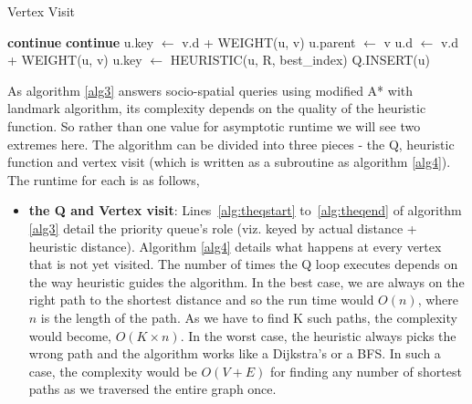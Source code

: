 {\begin{algorithm}[t]
\begin{scriptsize}
\begin{algorithmic}[1]
\end{algorithmic}

\end{scriptsize}
\end{algorithm}


\begin{algorithm}[t]
\caption{Vertex Visit}
\begin{scriptsize}
\label{alg4}
\begin{algorithmic}[1]
		 \label{alg:liesin}
			\State \textbf{continue}
		\EndIf
					\State \textbf{continue}
				\Else
					\State u.key $\gets$ v.d + WEIGHT(u, v)
				\EndIf
			\Else
				\State u.parent $\gets$ v
				\State u.d $\gets$ v.d + WEIGHT(u, v)
				\State u.key $\gets$ HEURISTIC(u, R, best\_index)
				\State Q.INSERT(u)
			\EndIf
		\EndIf
	\EndFor
\EndFunction
\end{algorithmic}

\end{scriptsize}
\end{algorithm}

As algorithm \ref{alg3} answers socio-spatial queries using modified A* with landmark algorithm, its complexity depends on the quality of the heuristic function. So rather than one value for asymptotic runtime we will see two extremes here. The algorithm can be divided into three pieces - the Q, heuristic function and vertex visit (which is written as a subroutine as algorithm \ref{alg4}). The runtime for each is as follows,

\begin{itemize}

	\item \textbf{the Q and Vertex visit}: Lines~\ref{alg:theqstart} to~\ref{alg:theqend} of algorithm \ref{alg3} detail the priority queue's role (viz. keyed by actual distance + heuristic distance). Algorithm \ref{alg4} details what happens at every vertex that is not yet visited. The number of times the Q loop executes depends on the way heuristic guides the algorithm. In the best case, we are always on the right path to the shortest distance and so the run time would $O(n)$, where $n$ is the length of the path. As we have to find K such paths, the complexity would become, $O(K \times n)$. In the worst case, the heuristic always picks the wrong path and the algorithm works like a Dijkstra's or a BFS. In such a case, the complexity would be $O(V + E)$ for finding any number of shortest paths as we traversed the entire graph once.


\end{itemize}}
